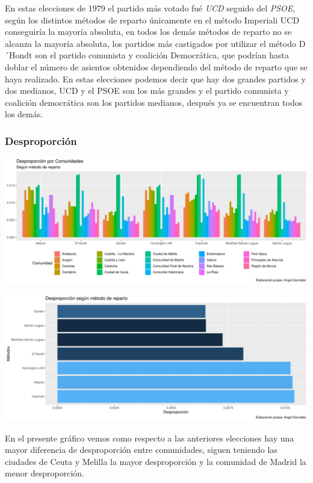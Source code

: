 \documentclass[12pt,a4paper,]{book}
\numberwithin{dummy}{section}
\theoremstyle{ocrenumbox}
\theoremstyle{blacknumex}
\theoremstyle{blacknumbox}
\theoremstyle{ocrenum}
\theoremstyle{ocrenum}
\begin{document}
En estas elecciones de 1979 el partido más votado fué \emph{UCD} seguido
del \emph{PSOE}, según los distintos métodos de reparto únicamente en el
método Imperiali UCD conseguiría la mayoría absoluta, en todos los demás
métodos de reparto no se alcanza la mayoría absoluta, los partidos más
castigados por utilizar el método D´Hondt son el partido comunista y
coalición Democrática, que podrían hasta doblar el número de asientos
obtenidos dependiendo del método de reparto que se haya realizado. En
estas elecciones podemos decir que hay dos grandes partidos y dos
medianos, UCD y el PSOE son los más grandes y el partido comunista y
coalición democrática son los partidos medianos, después ya se
encuentran todos los demás.

\hypertarget{desproporciuxf3n-1}{%
\subsubsection{Desproporción}\label{desproporciuxf3n-1}}

\begin{center}\includegraphics[width=0.95\linewidth]{figurasR/unnamed-chunk-72-1} \end{center}

\begin{center}\includegraphics[width=0.95\linewidth]{figurasR/unnamed-chunk-72-2} \end{center}

En el presente gráfico vemos como respecto a las anteriores elecciones
hay una mayor diferencia de desproporción entre comunidades, siguen
teniendo las ciudades de Ceuta y Melilla la mayor desproporción y la
comunidad de Madrid la menor desproporción.
\end{document}
